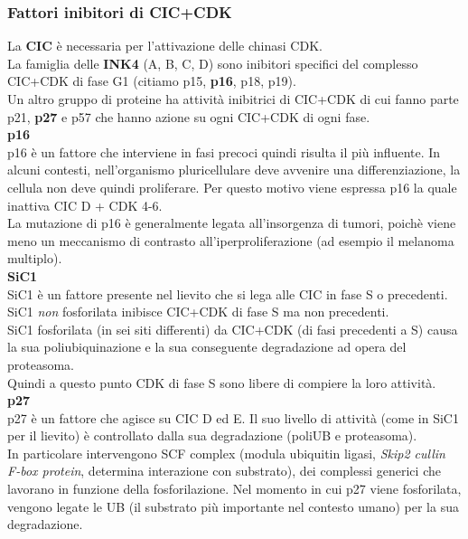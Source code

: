         \subsubsection{Fattori inibitori di CIC+CDK}
            La \textbf{CIC} è necessaria per l'attivazione delle chinasi CDK.\\
            La famiglia delle \textbf{INK4} (A, B, C, D) sono inibitori specifici del complesso CIC+CDK di fase G1 (citiamo p15, \textbf{p16}, p18, p19). \\
            Un altro gruppo di proteine ha attività inibitrici di CIC+CDK di cui fanno parte p21, \textbf{p27} e p57 che hanno azione su ogni CIC+CDK di ogni fase.\\
            
            \textbf{p16}\\
                p16 è un fattore che interviene in fasi precoci quindi risulta il più influente. In alcuni contesti, nell'organismo pluricellulare deve avvenire una differenziazione, la cellula non deve quindi proliferare.
                Per questo motivo viene espressa p16 la quale inattiva CIC D + CDK 4-6. \\
                La mutazione di p16 è generalmente legata all'insorgenza di tumori, poichè viene meno un meccanismo di contrasto all'iperproliferazione (ad esempio il melanoma multiplo).\\
                
            \textbf{SiC1}\\
                SiC1 è un fattore presente nel lievito che si lega alle CIC in fase S o precedenti. SiC1 \textit{non} fosforilata inibisce CIC+CDK di fase S ma non precedenti. \\
                SiC1 fosforilata (in sei siti differenti) da CIC+CDK (di fasi precedenti a S) causa la sua poliubiquinazione e la sua conseguente degradazione ad opera del proteasoma.\\
                Quindi a questo punto CDK di fase S sono libere di compiere la loro attività.\\
                
            \textbf{p27}\\
                p27 è un fattore che agisce su CIC D ed E. Il suo livello di attività (come in SiC1 per il lievito) è controllato dalla sua degradazione (poliUB e proteasoma). \\
                In particolare intervengono SCF complex (modula ubiquitin ligasi, \textit{Skip2 cullin F-box protein}, determina interazione con substrato), dei complessi generici che lavorano in funzione della fosforilazione. 
                Nel momento in cui p27 viene fosforilata, vengono legate le UB (il substrato più importante nel contesto umano) per la sua degradazione.
        
